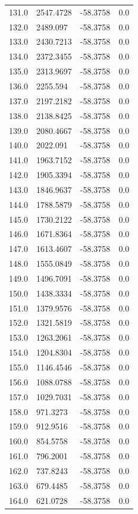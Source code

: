 \begin{table}[H]
\begin{tabular}{llll}
131.0 & 2547.4728 & -58.3758 & 0.0 \\
132.0 & 2489.097 & -58.3758 & 0.0 \\
133.0 & 2430.7213 & -58.3758 & 0.0 \\
134.0 & 2372.3455 & -58.3758 & 0.0 \\
135.0 & 2313.9697 & -58.3758 & 0.0 \\
136.0 & 2255.594 & -58.3758 & 0.0 \\
137.0 & 2197.2182 & -58.3758 & 0.0 \\
138.0 & 2138.8425 & -58.3758 & 0.0 \\
139.0 & 2080.4667 & -58.3758 & 0.0 \\
140.0 & 2022.091 & -58.3758 & 0.0 \\
141.0 & 1963.7152 & -58.3758 & 0.0 \\
142.0 & 1905.3394 & -58.3758 & 0.0 \\
143.0 & 1846.9637 & -58.3758 & 0.0 \\
144.0 & 1788.5879 & -58.3758 & 0.0 \\
145.0 & 1730.2122 & -58.3758 & 0.0 \\
146.0 & 1671.8364 & -58.3758 & 0.0 \\
147.0 & 1613.4607 & -58.3758 & 0.0 \\
148.0 & 1555.0849 & -58.3758 & 0.0 \\
149.0 & 1496.7091 & -58.3758 & 0.0 \\
150.0 & 1438.3334 & -58.3758 & 0.0 \\
151.0 & 1379.9576 & -58.3758 & 0.0 \\
152.0 & 1321.5819 & -58.3758 & 0.0 \\
153.0 & 1263.2061 & -58.3758 & 0.0 \\
154.0 & 1204.8304 & -58.3758 & 0.0 \\
155.0 & 1146.4546 & -58.3758 & 0.0 \\
156.0 & 1088.0788 & -58.3758 & 0.0 \\
157.0 & 1029.7031 & -58.3758 & 0.0 \\
158.0 & 971.3273 & -58.3758 & 0.0 \\
159.0 & 912.9516 & -58.3758 & 0.0 \\
160.0 & 854.5758 & -58.3758 & 0.0 \\
161.0 & 796.2001 & -58.3758 & 0.0 \\
162.0 & 737.8243 & -58.3758 & 0.0 \\
163.0 & 679.4485 & -58.3758 & 0.0 \\
164.0 & 621.0728 & -58.3758 & 0.0 \\

\end{tabular}
\end{table}
